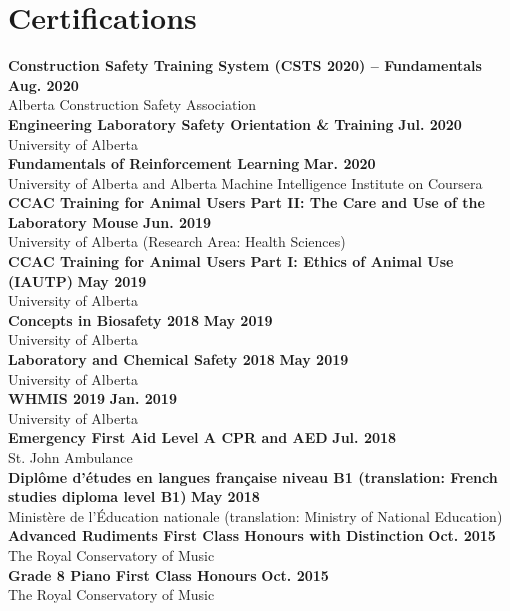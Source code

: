 \documentclass{article}
\begin{document}
\section*{\textcolor{my_red}{Certifications}}
    \textbf{Construction Safety Training System (CSTS 2020) -- Fundamentals} \hfill \textbf{Aug. 2020}\\
    Alberta Construction Safety Association\\[0.5em]
    \textbf{Engineering Laboratory Safety Orientation \& Training} \hfill \textbf{Jul. 2020}\\
    University of Alberta\\[0.5em]
    \textbf{Fundamentals of Reinforcement Learning} \hfill \textbf{Mar. 2020}\\
    University of Alberta and Alberta Machine Intelligence Institute on Coursera\\[0.5em]
    \textbf{CCAC Training for Animal Users Part II: The Care and Use of the Laboratory Mouse} \hfill \textbf{Jun. 2019}\\
    University of Alberta (Research Area: Health Sciences)\\[0.5em]
    \textbf{CCAC Training for Animal Users Part I: Ethics of Animal Use (IAUTP)} \hfill \textbf{May 2019}\\
    University of Alberta\\[0.5em]
    \textbf{Concepts in Biosafety 2018} \hfill \textbf{May 2019}\\
    University of Alberta\\[0.5em]
    \textbf{Laboratory and Chemical Safety 2018} \hfill \textbf{May 2019}\\
    University of Alberta\\[0.5em]
    \textbf{WHMIS 2019} \hfill \textbf{Jan. 2019}\\
    University of Alberta\\[0.5em]
    \textbf{Emergency First Aid Level A CPR and AED} \hfill \textbf{Jul. 2018}\\
    St. John Ambulance\\[0.5em]
    \textbf{Dipl\^ome d'\'etudes en langues fran\c{c}aise niveau B1 (translation: French studies diploma level B1)} \hfill \textbf{May 2018}\\
    Minist\`ere de l'\'Education nationale (translation: Ministry of National Education)\\[0.5em]
    \textbf{Advanced Rudiments First Class Honours with Distinction} \hfill \textbf{Oct. 2015}\\
    The Royal Conservatory of Music\\[0.5em]
    \textbf{Grade 8 Piano First Class Honours} \hfill \textbf{Oct. 2015}\\
    The Royal Conservatory of Music
\end{document}
